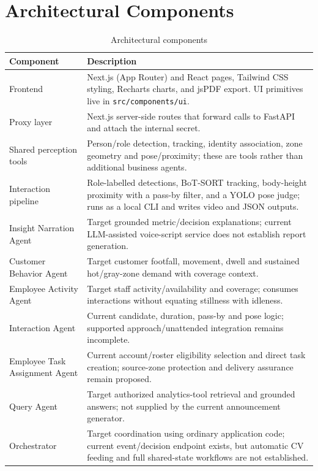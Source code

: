 \section{Architectural Components}
\begin{table}[H]
\centering
\caption{Architectural components}
\begin{tabular}{P{0.26\textwidth}P{0.62\textwidth}}
\toprule
Component & Description\\
\midrule
Frontend & Next.js (App Router) and React pages, Tailwind CSS styling, Recharts charts, and jsPDF export. UI primitives live in \texttt{src/components/ui}.\\
Proxy layer & Next.js server-side routes that forward calls to FastAPI and attach the internal secret.\\
Shared perception tools & Person/role detection, tracking, identity association, zone geometry and pose/proximity; these are tools rather than additional business agents.\\
Interaction pipeline & Role-labelled detections, BoT-SORT tracking, body-height proximity with a pass-by filter, and a YOLO pose judge; runs as a local CLI and writes video and JSON outputs.\\
Insight Narration Agent & Target grounded metric/decision explanations; current LLM-assisted voice-script service does not establish report generation.\\
Customer Behavior Agent & Target customer footfall, movement, dwell and sustained hot/gray-zone demand with coverage context.\\
Employee Activity Agent & Target staff activity/availability and coverage; consumes interactions without equating stillness with idleness.\\
Interaction Agent & Current candidate, duration, pass-by and pose logic; supported approach/unattended integration remains incomplete.\\
Employee Task Assignment Agent & Current account/roster eligibility selection and direct task creation; source-zone protection and delivery assurance remain proposed.\\
Query Agent & Target authorized analytics-tool retrieval and grounded answers; not supplied by the current announcement generator.\\
Orchestrator & Target coordination using ordinary application code; current event/decision endpoint exists, but automatic CV feeding and full shared-state workflows are not established.\\
\bottomrule
\end{tabular}
\end{table}

